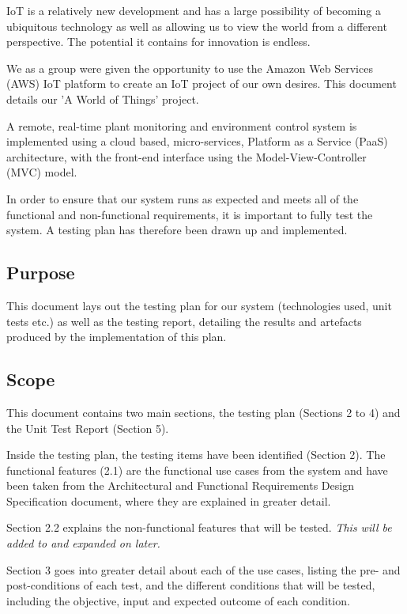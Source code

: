 \documentclass{article}
\begin{document}
	IoT is a relatively new development and has a large possibility of becoming a ubiquitous technology as well as allowing us to view the world from a different perspective. The potential it contains for innovation is endless.
	
	We as a group were given the opportunity to use the Amazon Web Services (AWS) IoT platform to create an IoT project of our own desires. This document details our 'A World of Things' project.
	
	A remote, real-time plant monitoring and environment control system is implemented using a cloud based, micro-services, Platform as a Service (PaaS) architecture, with the front-end interface using the Model-View-Controller (MVC) model.
	
	In order to ensure that our system runs as expected and meets all of the functional and non-functional requirements, it is important to fully test the system. A testing plan has therefore been drawn up and implemented.
	
	\subsection{Purpose}
		This document lays out the testing plan for our system (technologies used, unit tests etc.) as well as the testing report, detailing the results and artefacts produced by the implementation of this plan.
		
	\subsection{Scope}
		This document contains two main sections, the testing plan (Sections 2 to 4) and the Unit Test Report (Section 5).
		
		Inside the testing plan, the testing items have been identified (Section 2). The functional features (2.1) are the functional use cases from the system and have been taken from the Architectural and Functional Requirements Design Specification document, where they are explained in greater detail.
		
		Section 2.2 explains the non-functional features that will be tested. \textit{This will be added to and expanded on later.}
		
		Section 3 goes into greater detail about each of the use cases, listing the pre- and post-conditions of each test, and the different conditions that will be tested, including the objective, input and expected outcome of each condition.
		
\end{document}
